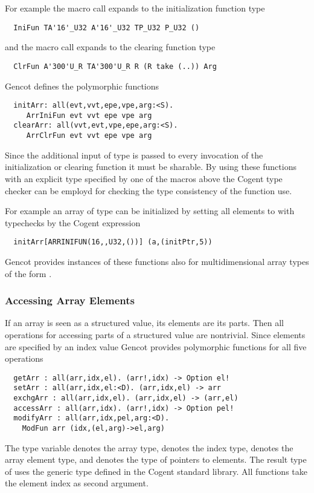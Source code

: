 For example the macro call  expands to the initialization function type
\begin{verbatim}
  IniFun TA'16'_U32 A'16'_U32 TP_U32 P_U32 ()
\end{verbatim}
and the macro call  expands to the clearing function type
\begin{verbatim}
  ClrFun A'300'U_R TA'300'U_R R (R take (..)) Arg
\end{verbatim}

Gencot defines the polymorphic functions
\begin{verbatim}
  initArr: all(evt,vvt,epe,vpe,arg:<S). 
     ArrIniFun evt vvt epe vpe arg
  clearArr: all(vvt,evt,vpe,epe,arg:<S). 
     ArrClrFun evt vvt epe vpe arg
\end{verbatim}
Since the additional input of type  is passed to every invocation of the initialization or clearing function
it must be sharable.
By using these functions with an explicit type specified by one of the macros above the Cogent type checker can be employd 
for checking the type consistency of the function use.

For example an array  of type  can be initialized by setting all elements to  with typechecks by 
the Cogent expression
\begin{verbatim}
  initArr[ARRINIFUN(16,,U32,())] (a,(initPtr,5))
\end{verbatim}

Gencot provides instances of these functions also for multidimensional array types of the form .

\subsubsection{Accessing Array Elements}

If an array is seen as a structured value, its elements are its parts.
Then all operations for accessing parts of a structured value are nontrivial. Since elements are specified by an index value
Gencot provides polymorphic functions for all five operations
\begin{verbatim}
  getArr : all(arr,idx,el). (arr!,idx) -> Option el!
  setArr : all(arr,idx,el:<D). (arr,idx,el) -> arr
  exchgArr : all(arr,idx,el). (arr,idx,el) -> (arr,el)
  accessArr : all(arr,idx). (arr!,idx) -> Option pel!
  modifyArr : all(arr,idx,pel,arg:<D). 
    ModFun arr (idx,(el,arg)->el,arg)
\end{verbatim}
The type variable  denotes the array type,  denotes the index type,
 denotes the array element type, and  denotes the type of pointers to elements. 
The result type of  uses the generic type  defined in
the Cogent standard library. All functions take the element index as second argument.

